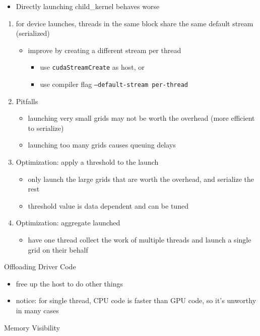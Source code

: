 \documentclass{article}
\begin{document}
\begin{itemize}
\item Directly launching child\_kernel behaves worse
\end{itemize}
\begin{enumerate}
\item for device launches, threads in the same block share the same default stream (serialized)
\begin{itemize}
\item improve by creating a different stream per thread
\begin{itemize}
\item use \texttt{cudaStreamCreate} as host, or
\item use compiler flag \texttt{--default-stream per-thread}
\end{itemize}
\end{itemize}
\item Pitfalls
\begin{itemize}
\item launching very small grids may not be worth the overhead (more efficient to serialize)
\item launching too many grids causes queuing delays
\end{itemize}
\item Optimization: apply a threshold to the launch
\begin{itemize}
\item only launch the large grids that are worth the overhead, and serialize the rest
\item threshold value is data dependent and can be tuned
\end{itemize}
\item Optimization: aggregate launched
\begin{itemize}
\item have one thread collect the work of multiple threads and launch a single grid on their behalf

\end{itemize}
\end{enumerate}
Offloading Driver Code

\begin{itemize}
\item free up the host to do other things
\item notice: for single thread, CPU code is faster than GPU code, so it's unworthy in many cases

\end{itemize}
Memory Visibility
\end{document}
